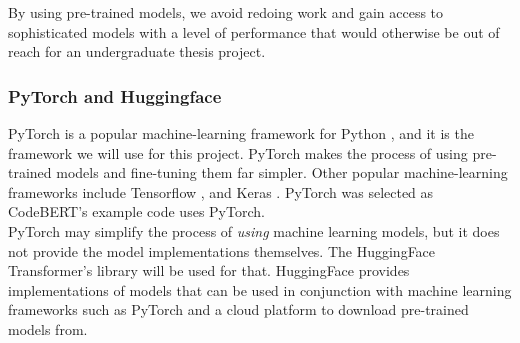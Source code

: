 \noindent
By using pre-trained models, we avoid redoing work and gain access to sophisticated models with a level of performance that would otherwise be out of reach for an undergraduate thesis project. \\



\subsubsection{PyTorch and Huggingface}

\noindent
PyTorch is a popular machine-learning framework for Python \cite{pytorch}, and it is the framework we will use for this project. PyTorch makes the process of using pre-trained models and fine-tuning them far simpler. Other popular machine-learning frameworks include Tensorflow \cite{tensorflow}, and Keras \cite{keras}. PyTorch was selected as CodeBERT's example code uses PyTorch. \\

\noindent
PyTorch may simplify the process of \emph{using} machine learning models, but it does not provide the model implementations themselves. The HuggingFace Transformer's library \cite{huggingface} will be used for that. HuggingFace provides implementations of models that can be used in conjunction with machine learning frameworks such as PyTorch and a cloud platform to download pre-trained models from.\\

